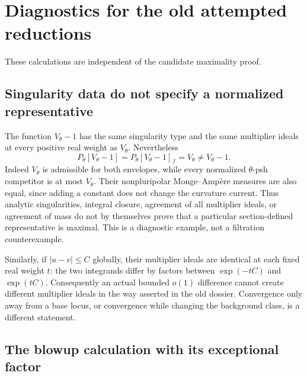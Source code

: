 \section{Diagnostics for the old attempted reductions}
\label{sec:p147-diagnostics}

These calculations are independent of the candidate maximality proof.

\subsection{Singularity data do not specify a normalized representative}

The function \(V_\theta-1\) has the same singularity type and the same
multiplier ideals at every positive real weight as \(V_\theta\).
Nevertheless
\[
 P_\theta[V_\theta-1]
   =P_\theta[V_\theta-1]_{\mathcal I}
   =V_\theta\ne V_\theta-1.
\]
Indeed \(V_\theta\) is admissible for both envelopes, while every
normalized \(\theta\)-psh competitor is at most \(V_\theta\).
Their nonpluripolar Monge--Amp\`ere measures are also equal, since
adding a constant does not change the curvature current.
Thus analytic singularities, integral closure, agreement of all
multiplier ideals, or agreement of mass do not by themselves prove that
a particular section-defined representative is maximal.
This is a diagnostic example, not a filtration counterexample.

Similarly, if \(|u-v|\leq C\) globally, their multiplier ideals are
identical at each fixed real weight \(t\): the two integrands differ by
factors between \(\exp(-tC)\) and \(\exp(tC)\).
Consequently an actual bounded \(o(1)\) difference cannot create different
multiplier ideals in the way asserted in the old dossier.
Convergence only away from a base locus, or convergence while changing
the background class, is a different statement.

\subsection{The blowup calculation with its exceptional factor}

